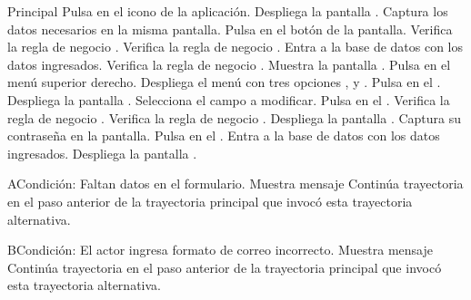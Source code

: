	\begin{UCtrayectoria}{Principal}
		\UCpaso[\UCactor] Pulsa en el icono de la aplicación.
		\UCpaso[\UCsist] Despliega la pantalla .
		\UCpaso[\UCactor] Captura los datos necesarios en la misma pantalla.
		\UCpaso[\UCactor] Pulsa en el botón  de la pantalla.
		\UCpaso[\UCsist] Verifica la regla de negocio . 
		\UCpaso[\UCsist] Verifica la regla de negocio . 
		\UCpaso[\UCsist] Entra a la base de datos con los datos ingresados. 
		\UCpaso[\UCsist] Verifica la regla de negocio . 		
		\UCpaso[\UCsist] Muestra la pantalla .
		\UCpaso[\UCactor] Pulsa en el menú superior derecho.
		\UCpaso[\UCsist] Despliega el menú con tres opciones , y .
		\UCpaso[\UCactor] Pulsa en el  .
		\UCpaso[\UCsist] Despliega la pantalla .
		\UCpaso[\UCactor] Selecciona el campo a modificar.
		\UCpaso[\UCactor] Pulsa en el  .
		\UCpaso[\UCsist] Verifica la regla de negocio . 
		\UCpaso[\UCsist] Verifica la regla de negocio . 
		\UCpaso[\UCsist] Despliega la pantalla .
		\UCpaso[\UCactor] Captura su contraseña en la pantalla.
		\UCpaso[\UCactor] Pulsa en el  . 
		\UCpaso[\UCsist] Entra a la base de datos con los datos ingresados. 
		\UCpaso[\UCsist] Despliega la pantalla .
	\end{UCtrayectoria}
	\begin{UCtrayectoriaA}{A}{Condición: Faltan datos en el formulario.}
		\UCpaso[\UCsist] Muestra mensaje 
		\UCpaso[\UCsist] Continúa trayectoria en el paso anterior de la trayectoria  principal que invocó esta trayectoria alternativa. 
	\end{UCtrayectoriaA}
	\begin{UCtrayectoriaA}{B}{Condición: El actor ingresa formato de correo incorrecto.}
		\UCpaso[\UCsist] Muestra mensaje 
		\UCpaso[\UCsist] Continúa trayectoria en el paso anterior de la trayectoria  principal que invocó esta trayectoria alternativa.  
	\end{UCtrayectoriaA}
